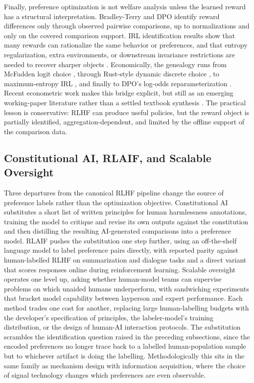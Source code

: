 Finally, preference optimization is not welfare analysis unless the learned reward has a structural interpretation. Bradley-Terry and DPO identify reward differences only through observed pairwise comparisons, up to normalizations and only on the covered comparison support. IRL identification results show that many rewards can rationalize the same behavior or preferences, and that entropy regularization, extra environments, or downstream invariance restrictions are needed to recover sharper objects \citep{cao2021identifiability,skalse2023invariance,knox2022preference}. Economically, the genealogy runs from McFadden logit choice \citep{mcfadden:1973}, through Rust-style dynamic discrete choice \citep{rust1994structural,rust1996numerical}, to maximum-entropy IRL \citep{Ziebart2008}, and finally to DPO's log-odds reparameterization \citep{rafailov2023direct}. Recent econometric work makes this bridge explicit, but still as an emerging working-paper literature rather than a settled textbook synthesis \citep{vanderlaan2025efficient}. The practical lesson is conservative: RLHF can produce useful policies, but the reward object is partially identified, aggregation-dependent, and limited by the offline support of the comparison data.

\subsection{Constitutional AI, RLAIF, and Scalable Oversight}

Three departures from the canonical RLHF pipeline change the source of preference labels rather than the optimization objective. Constitutional AI \citep{bai2022constitutional} substitutes a short list of written principles for human harmlessness annotations, training the model to critique and revise its own outputs against the constitution and then distilling the resulting AI-generated comparisons into a preference model. RLAIF \citep{lee2023rlaif} pushes the substitution one step further, using an off-the-shelf language model to label preference pairs directly, with reported parity against human-labelled RLHF on summarization and dialogue tasks and a direct variant that scores responses online during reinforcement learning. Scalable oversight \citep{bowman2022oversight} operates one level up, asking whether human-model teams can supervise problems on which unaided humans underperform, with sandwiching experiments that bracket model capability between layperson and expert performance. Each method trades one cost for another, replacing large human-labelling budgets with the developer's specification of principles, the labeler-model's training distribution, or the design of human-AI interaction protocols. The substitution scrambles the identification question raised in the preceding subsections, since the encoded preferences no longer trace back to a labelled human-population sample but to whichever artifact is doing the labelling. Methodologically this sits in the same family as mechanism design with information acquisition, where the choice of signal technology changes which preferences are even observable.

